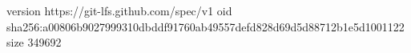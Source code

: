 version https://git-lfs.github.com/spec/v1
oid sha256:a00806b9027999310dbddf91760ab49557defd828d69d5d88712b1e5d1001122
size 349692

